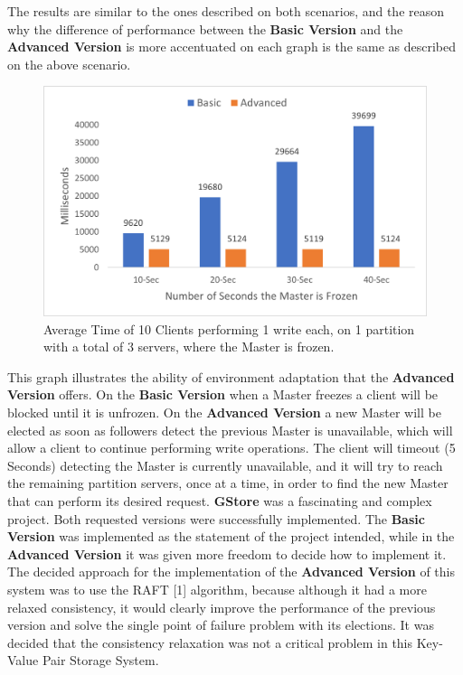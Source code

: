\documentclass[times, 10pt,twocolumn]{article}
\begin{document}
The results are similar to the ones described on both scenarios, and the reason why the difference of performance between the \textbf{Basic Version} and the \textbf{Advanced Version} is more accentuated on each graph is the same as described on the above scenario.
\begin{figure}[h!]
	\centering
	\includegraphics[scale=0.65]{Graphs/Client-FreezeMaster.png}
	\caption{Average Time of 10 Clients performing 1 write each, on 1 partition with a total of 3 servers, where the Master is frozen.}
\end{figure}
\newpage
This graph illustrates the ability of environment adaptation that the \textbf{Advanced Version} offers. On the \textbf{Basic Version} when a Master freezes a client will be blocked until it is unfrozen. On the \textbf{Advanced Version} a new Master will be elected as soon as followers detect the previous Master is unavailable, which will allow a client to continue performing write operations. The client will timeout (5 Seconds) detecting the Master is currently unavailable, and it will try to reach the remaining partition servers, once at a time, in order to find the new Master that can perform its desired request.
\textbf{GStore} was a fascinating and complex project. Both requested versions were successfully implemented. The \textbf{Basic Version} was implemented as the statement of the project intended, while in the \textbf{Advanced Version} it was given more freedom to decide how to implement it. The decided approach for the implementation of the \textbf{Advanced Version} of this system was to use the RAFT [1] algorithm, because although it had a more relaxed consistency, it would clearly improve the performance of the previous version and solve the single point of failure problem with its elections. It was decided that the consistency relaxation was not a critical problem in this Key-Value Pair Storage System.
\nocite{ex1,ex2}


\end{document}
